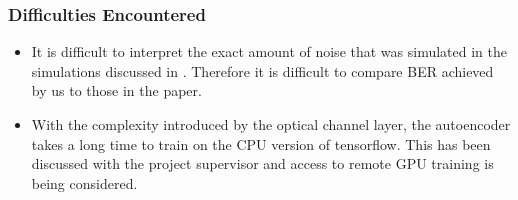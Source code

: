 \subsubsection{Difficulties Encountered}
\begin{itemize}
    \item It is difficult to interpret the exact amount of noise that was simulated in the simulations discussed in \autocite{8433895}. Therefore it is difficult to compare BER achieved by us to those in the paper.
    
    \item With the complexity introduced by the optical channel layer, the autoencoder takes a long time to train on the CPU version of tensorflow. This has been discussed with the project supervisor and access to remote GPU training is being considered.
    
\end{itemize}